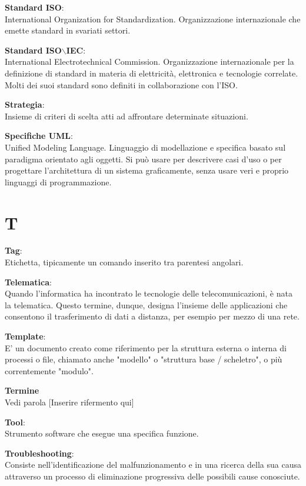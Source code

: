 \documentclass[a4paper, oneside, openany, dvipsnames, table]{article}
\begin{document}
\textbf{Standard ISO}:\\	International Organization for Standardization. Organizzazione internazionale che emette standard in svariati settori.

\textbf{Standard ISO$\backslash$IEC}:\\	International Electrotechnical Commission. Organizzazione internazionale per la definizione di standard in materia di elettricità, elettronica e tecnologie correlate. Molti dei suoi standard sono definiti in collaborazione con l'ISO.

\textbf{Strategia}:\\Insieme di criteri di scelta atti ad affrontare determinate situazioni.

\textbf{Specifiche UML}:\\	Unified Modeling Language. Linguaggio di modellazione e specifica basato sul paradigma orientato agli oggetti. Si può usare per descrivere casi d'uso o per progettare l'architettura di un sistema graficamente, senza usare veri e proprio linguaggi di programmazione.


\newpage
\section{T}
\textbf{Tag}:\\		Etichetta, tipicamente un comando inserito tra parentesi angolari.

\textbf{Telematica}:\\	 Quando l'informatica ha incontrato le tecnologie delle telecomunicazioni, è nata la telematica. Questo termine, dunque, designa l'insieme delle applicazioni che consentono il trasferimento di dati a distanza, per esempio per mezzo di una rete. 

\textbf{Template}:\\ E' un documento creato come riferimento per la struttura esterna o interna di processi o file, chiamato anche "modello" o "struttura base / scheletro", o più correntemente "modulo".

\textbf{Termine}\\
Vedi parola {[}Inserire rifermento qui{]}

\textbf{Tool}:\\	Strumento software che esegue una specifica funzione.

\textbf{Troubleshooting}:\\	Consiste nell'identificazione del malfunzionamento e in una ricerca della sua causa attraverso un processo di eliminazione progressiva delle possibili cause conosciute.
\end{document}
